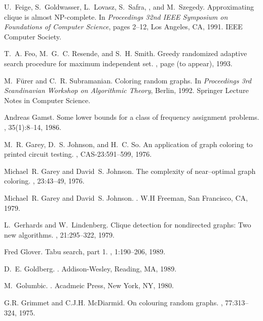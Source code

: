 \begin{thebibliography}{10}
U.~Feige, S.~Goldwasser, L.~Lovasz, S.~Safra, , and M.~Szegedy.
\newblock Approximating clique is almost {NP}-complete.
\newblock In {\em Proceedings 32nd {IEEE} {S}ymposium on {F}oundations of
  {C}omputer {S}cience}, pages 2--12, Los Angeles, CA, 1991. IEEE Computer
  Society.

T.~A. Feo, M.~G.~C. Resende, and S.~H. Smith.
\newblock Greedy randomized adaptive search procedure for maximum independent
  set.
, page (to appear), 1993.

M.~F\"{u}rer and C.~R. Subramanian.
\newblock Coloring random graphs.
\newblock In {\em Proceedings 3rd Scandinavian Workshop on Algorithmic Theory},
  Berlin, 1992. Springer Lecture Notes in Computer Science.

Andreas Gamst.
\newblock Some lower bounds for a class of frequency assignment problems.
, 35(1):8--14, 1986.

M.~R. Garey, D.~S. Johnson, and H.~C. So.
\newblock An application of graph coloring to printed circuit testing.
, CAS-23:591--599, 1976.

Michael~R. Garey and David~S. Johnson.
\newblock The complexity of near--optimal graph coloring.
, 23:43--49,
  1976.

Michael~R. Garey and David~S. Johnson.
.
\newblock W.H Freeman, San Francisco, CA, 1979.

L.~Gerhards and W.~Lindenberg.
\newblock Clique detection for nondirected graphs: Two new algorithms.
, 21:295--322, 1979.

Fred Glover.
\newblock Tabu search, part 1.
, 1:190--206, 1989.

D.~E. Goldberg.
.
\newblock Addison-Wesley, Reading, MA, 1989.

M.~Golumbic.
.
\newblock Acadmeic Press, New York, NY, 1980.

G.R. Grimmet and C.J.H. McDiarmid.
\newblock On colouring random graphs.
, 77:313--324, 1975.


\end{thebibliography}
